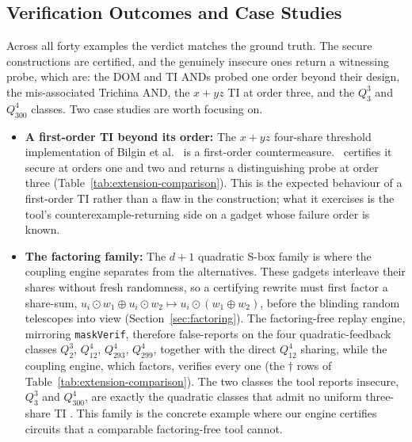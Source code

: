   \subsection{Verification Outcomes and Case Studies}
  \label{sec:eval-outcomes}

  Across all forty examples the verdict matches the ground truth. The secure
  constructions are certified, and the genuinely insecure ones return a witnessing
  probe, which are: the DOM and TI ANDs probed one order beyond their design, the mis-associated
  Trichina AND, the $x+yz$ TI at order three, and the $Q^3_3$ and $Q^4_{300}$
  classes. Two case studies are worth focusing on.

  \begin{itemize}
    \item \textbf{A first-order TI beyond its order:}
    The $x+yz$ four-share threshold implementation of Bilgin et al.\
    \parencite{bilgin2015threshold} is a first-order countermeasure. \toolname\
    certifies it secure at orders one and two and returns a distinguishing probe at
    order three (Table~\ref{tab:extension-comparison}). This is the expected behaviour
    of a first-order TI rather than a flaw in the construction; what it exercises is
    the tool's counterexample-returning side on a gadget whose failure order is known.

    \item \textbf{The factoring family:}
    The $d{+}1$ quadratic S-box family is where the coupling engine separates from the
    alternatives. These gadgets interleave their shares without fresh randomness, so a
    certifying rewrite must first factor a share-sum,
    $u_i \odot w_1 \oplus u_i \odot w_2 \mapsto u_i \odot (w_1 \oplus w_2)$, before the
    blinding random telescopes into view (Section~\ref{sec:factoring}). The
    factoring-free replay engine, mirroring \texttt{maskVerif}, therefore
    false-reports \Insecure{} on the four quadratic-feedback classes $Q^3_2$,
    $Q^4_{12}$, $Q^4_{293}$, $Q^4_{299}$, together with the direct $Q^4_{12}$ sharing,
    while the coupling engine, which factors, verifies every
    one (the $\dagger$ rows of Table~\ref{tab:extension-comparison}). The two classes
    the tool reports insecure, $Q^3_3$ and $Q^4_{300}$, are exactly the quadratic
    classes that admit no uniform three-share TI \parencite{bilgin2015threshold}.
    This family is the concrete example where our engine certifies circuits that a
    comparable factoring-free tool cannot.
  \end{itemize}


